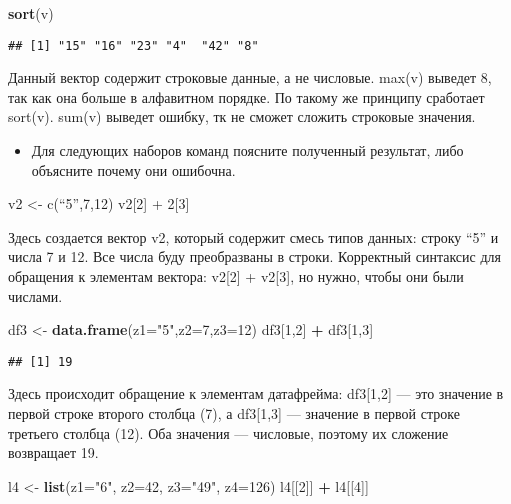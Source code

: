 \documentclass[
]{article}
\newenvironment{Shaded}{\begin{snugshade}}{\end{snugshade}}
\newcommand{\AttributeTok}[1]{\textcolor[rgb]{0.13,0.29,0.53}{#1}}
\newcommand{\DecValTok}[1]{\textcolor[rgb]{0.00,0.00,0.81}{#1}}
\newcommand{\FunctionTok}[1]{\textcolor[rgb]{0.13,0.29,0.53}{\textbf{#1}}}
\newcommand{\NormalTok}[1]{#1}
\newcommand{\OtherTok}[1]{\textcolor[rgb]{0.56,0.35,0.01}{#1}}
\newcommand{\SpecialCharTok}[1]{\textcolor[rgb]{0.81,0.36,0.00}{\textbf{#1}}}
\newcommand{\StringTok}[1]{\textcolor[rgb]{0.31,0.60,0.02}{#1}}
\providecommand{\tightlist}{%
  \setlength{\itemsep}{0pt}\setlength{\parskip}{0pt}}
\begin{document}
\begin{Shaded}
\begin{Highlighting}[]
\FunctionTok{sort}\NormalTok{(v)}
\end{Highlighting}
\end{Shaded}

\begin{verbatim}
## [1] "15" "16" "23" "4"  "42" "8"
\end{verbatim}

Данный вектор содержит строковые данные, а не числовые. max(v) выведет
8, так как она больше в алфавитном порядке. По такому же принципу
сработает sort(v). sum(v) выведет ошибку, тк не сможет сложить строковые
значения.

\begin{itemize}
\tightlist
\item
  Для следующих наборов команд поясните полученный результат, либо
  объясните почему они ошибочна.
\end{itemize}

v2 \textless- c(``5'',7,12) v2{[}2{]} + 2{[}3{]}

Здесь создается вектор v2, который содержит смесь типов данных: строку
``5'' и числа 7 и 12. Все числа буду преобразваны в строки. Корректный
синтаксис для обращения к элементам вектора: v2{[}2{]} + v2{[}3{]}, но
нужно, чтобы они были числами.

\begin{Shaded}
\begin{Highlighting}[]
\NormalTok{df3 }\OtherTok{\textless{}{-}} \FunctionTok{data.frame}\NormalTok{(}\AttributeTok{z1=}\StringTok{"5"}\NormalTok{,}\AttributeTok{z2=}\DecValTok{7}\NormalTok{,}\AttributeTok{z3=}\DecValTok{12}\NormalTok{)}
\NormalTok{df3[}\DecValTok{1}\NormalTok{,}\DecValTok{2}\NormalTok{] }\SpecialCharTok{+}\NormalTok{ df3[}\DecValTok{1}\NormalTok{,}\DecValTok{3}\NormalTok{]}
\end{Highlighting}
\end{Shaded}

\begin{verbatim}
## [1] 19
\end{verbatim}

Здесь происходит обращение к элементам датафрейма: df3{[}1,2{]} --- это
значение в первой строке второго столбца (7), а df3{[}1,3{]} ---
значение в первой строке третьего столбца (12). Оба значения ---
числовые, поэтому их сложение возвращает 19.

\begin{Shaded}
\begin{Highlighting}[]
\NormalTok{l4 }\OtherTok{\textless{}{-}} \FunctionTok{list}\NormalTok{(}\AttributeTok{z1=}\StringTok{"6"}\NormalTok{, }\AttributeTok{z2=}\DecValTok{42}\NormalTok{, }\AttributeTok{z3=}\StringTok{"49"}\NormalTok{, }\AttributeTok{z4=}\DecValTok{126}\NormalTok{)}
\NormalTok{l4[[}\DecValTok{2}\NormalTok{]] }\SpecialCharTok{+}\NormalTok{ l4[[}\DecValTok{4}\NormalTok{]]}
\end{Highlighting}
\end{Shaded}
\end{document}
